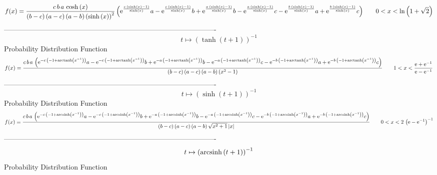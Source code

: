 \documentclass[12pt]{article}
\begin{document}
$$  f(x)={\frac {c\,b\,a\,\cosh \left( x \right) }{ \left( b-c \right)  \left( 
a-c \right)  \left( a-b \right)  \left( \sinh \left( x \right) 
 \right) ^{2}} \left( {{\rm e}^{{\frac {c\, \left( \sinh \left( x
 \right) -1 \right) }{\sinh \left( x \right) }}}}a-{{\rm e}^{{\frac {c
\, \left( \sinh \left( x \right) -1 \right) }{\sinh \left( x \right) }
}}}b+{{\rm e}^{{\frac {a\, \left( \sinh \left( x \right) -1 \right) }{
\sinh \left( x \right) }}}}b-{{\rm e}^{{\frac {a\, \left( \sinh
 \left( x \right) -1 \right) }{\sinh \left( x \right) }}}}c-{{\rm e}^{
{\frac {b\, \left( \sinh \left( x \right) -1 \right) }{\sinh \left( x
 \right) }}}}a+{{\rm e}^{{\frac {b\, \left( \sinh \left( x \right) -1
 \right) }{\sinh \left( x \right) }}}}c \right) }
 \qquad0
 < x < \ln  \left( 1+\sqrt {2} \right) 
$$-------------------------------------------------------------------------------------------  \\$$t\mapsto  \left( \tanh \left( t+1 \right)  \right) ^{-1}
$$Probability Distribution Function 
$$  f(x)={\frac {c\,b\,a\, \left( {{\rm e}^{-c\, \left( -1+{\rm arctanh} \left(
{x}^{-1}\right) \right) }}a-{{\rm e}^{-c\, \left( -1+{\rm arctanh} 
\left({x}^{-1}\right) \right) }}b+{{\rm e}^{-a\, \left( -1+
{\rm arctanh} \left({x}^{-1}\right) \right) }}b-{{\rm e}^{-a\, \left( 
-1+{\rm arctanh} \left({x}^{-1}\right) \right) }}c-{{\rm e}^{-b\,
 \left( -1+{\rm arctanh} \left({x}^{-1}\right) \right) }}a+{{\rm e}^{-
b\, \left( -1+{\rm arctanh} \left({x}^{-1}\right) \right) }}c \right) 
}{ \left( b-c \right)  \left( a-c \right)  \left( a-b \right)  \left( 
{x}^{2}-1 \right) }}
 \qquad1
 < x < {\frac {{\rm e}+{{\rm e}^{-1}}}{{\rm e}-{{\rm e}^{-1}}}}
$$-------------------------------------------------------------------------------------------  \\$$t\mapsto  \left( \sinh \left( t+1 \right)  \right) ^{-1}
$$Probability Distribution Function 
$$  f(x)={\frac {c\,b\,a\, \left( {{\rm e}^{-c\, \left( -1+{\rm arcsinh} \left(
{x}^{-1}\right) \right) }}a-{{\rm e}^{-c\, \left( -1+{\rm arcsinh} 
\left({x}^{-1}\right) \right) }}b+{{\rm e}^{-a\, \left( -1+
{\rm arcsinh} \left({x}^{-1}\right) \right) }}b-{{\rm e}^{-a\, \left( 
-1+{\rm arcsinh} \left({x}^{-1}\right) \right) }}c-{{\rm e}^{-b\,
 \left( -1+{\rm arcsinh} \left({x}^{-1}\right) \right) }}a+{{\rm e}^{-
b\, \left( -1+{\rm arcsinh} \left({x}^{-1}\right) \right) }}c \right) 
}{ \left( b-c \right)  \left( a-c \right)  \left( a-b \right) \sqrt {{
x}^{2}+1} \left| x \right| }}
 \qquad0
 < x < 2\, \left( {\rm e}-{{\rm e}^{-1}} \right) ^{-1}
$$-------------------------------------------------------------------------------------------  \\$$t\mapsto  \left( {\rm arcsinh} \left(t+1\right) \right) ^{-1}
$$Probability Distribution Function 
\end{document}
